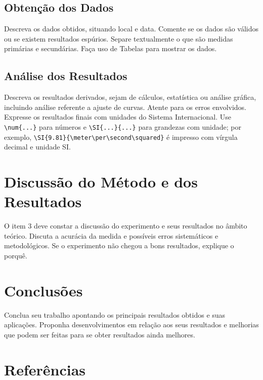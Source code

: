 \documentclass{relatorio}
\begin{document}
\subsection{Obtenção dos Dados}

Descreva os dados obtidos, situando local e data. Comente se os dados são válidos ou se existem resultados espúrios. Separe textualmente o que são medidas primárias e secundárias. Faça uso de Tabelas para mostrar os dados.

\subsection{Análise dos Resultados}

Descreva os resultados derivados, sejam de cálculos, estatística ou análise gráfica, incluindo análise referente a ajuste de curvas. Atente para os erros envolvidos. Expresse os resultados finais com unidades do Sistema Internacional. Use
\verb|\num{...}| para números e \verb|\SI{...}{...}| para grandezas com unidade;
por exemplo, \verb|\SI{9.81}{\meter\per\second\squared}| é impresso com vírgula
decimal e unidade SI.

\section{Discussão do Método e dos Resultados}

O item 3 deve constar a discussão do experimento e seus resultados no âmbito teórico. Discuta a acurácia da medida e possíveis erros sistemáticos e metodológicos. Se o experimento não chegou a bons resultados, explique o porquê.

\section{Conclusões}

Conclua seu trabalho apontando os principais resultados obtidos e suas aplicações. Proponha desenvolvimentos em relação aos seus resultados e melhorias que podem ser feitas para se obter resultados ainda melhores.

\section{Referências}
\end{document}

